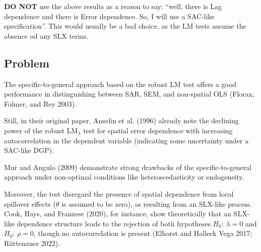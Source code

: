 \documentclass[
  letterpaper,
  DIV=11,
  numbers=noendperiod]{scrreprt}
\begin{document}
\begin{tcolorbox}[enhanced jigsaw, opacitybacktitle=0.6, left=2mm, leftrule=.75mm, toptitle=1mm, breakable, colback=white, bottomrule=.15mm, colframe=quarto-callout-warning-color-frame, colbacktitle=quarto-callout-warning-color!10!white, coltitle=black, bottomtitle=1mm, titlerule=0mm, title=\textcolor{quarto-callout-warning-color}{\faExclamationTriangle}\hspace{0.5em}{Take the LM test with a grain of salt}, opacityback=0, arc=.35mm, rightrule=.15mm, toprule=.15mm]

\textbf{DO NOT} use the above results as a reason to say: ``well, there
is Lag dependence and there is Error dependence. So, I will use a
SAC-like specification''. This would usually be a bad choice, as the LM
tests assume the absence od any SLX terms.

\end{tcolorbox}

\hypertarget{problem}{%
\subsection{Problem}\label{problem}}

The specific-to-general approach based on the robust LM test offers a
good performance in distinguishing between SAR, SEM, and non-spatial OLS
(Florax, Folmer, and Rey 2003).

Still, in their original paper, Anselin et al. (1996) already note the
declining power of the robust LM\(_\lambda\) test for spatial error
dependence with increasing autocorrelation in the dependent variable
(indicating some uncertainty under a SAC-like DGP).

Mur and Angulo (2009) demonstrate strong drawbacks of the
specific-to-general approach under non-optimal conditions like
heteroscedasticity or endogeneity.

Moreover, the test disregard the presence of spatial dependence from
local spillover effects (\(\theta\) is assumed to be zero), as resulting
from an SLX-like process. Cook, Hays, and Franzese (2020), for instance,
show theoretically that an SLX-like dependence structure leads to the
rejection of both hypotheses \(H_0\): \(\lambda=0\) and \(H_0\):
\(\rho=0\), though no autocorrelation is present (Elhorst and Halleck
Vega 2017; Rüttenauer 2022).
\end{document}
